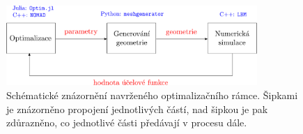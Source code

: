 \begin{figure}[H]
	\vspace{8mm}
	\centering
	\includegraphics[width=0.85\textwidth]{Images/framework.pdf}
	\vspace{7mm}
	\caption{Schématické znázornění navrženého optimalizačního rámce. Šipkami je znázorněno propojení jednotlivých částí, nad šipkou je pak zdůrazněno, co jednotlivé části předávají v procesu dále.}
	\label{fig:framework}
\end{figure}

